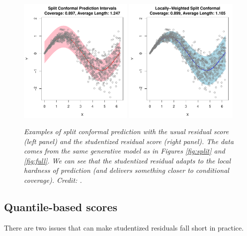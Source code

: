 \documentclass{article}
\begin{document}
\begin{figure}[htb]
\centering
\includegraphics[width=0.49\textwidth]{split_usual.pdf}
\includegraphics[width=0.49\textwidth]{split_student.pdf}
\caption{\it Examples of split conformal prediction with the usual residual
  score (left panel) and the studentized residual score (right panel). The data
  comes from the same generative model as in Figures \ref{fig:split} and 
  \ref{fig:full}. We can see that the studentized residual adapts to the local
  hardness of prediction (and delivers something closer to conditional
  coverage). Credit: \citet{lei2018distribution}.} 
\label{fig:student}
\end{figure}

\subsection{Quantile-based scores}

There are two issues that can make studentized residuals fall short in practice.   
\end{document}
